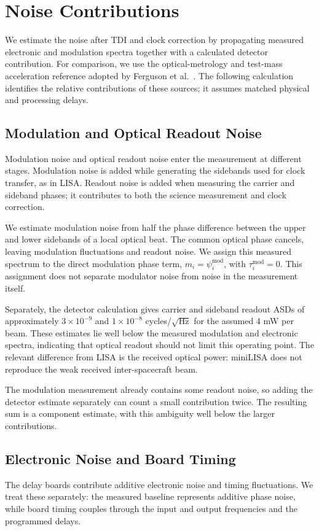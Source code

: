 \section{Noise Contributions}
\label{sec:performance}
We estimate the noise after TDI and clock correction by propagating measured electronic and modulation spectra together with a calculated detector contribution. For comparison, we use the optical-metrology and test-mass acceleration reference adopted by Ferguson et al.~\cite{ferguson2025applying}. The following calculation identifies the relative contributions of these sources; it assumes matched physical and processing delays.

\subsection{Modulation and Optical Readout Noise}
\label{sec:readout_noise}
Modulation noise and optical readout noise enter the measurement at different stages. Modulation noise is added while generating the sidebands used for clock transfer, as in LISA. Readout noise is added when measuring the carrier and sideband phases; it contributes to both the science measurement and clock correction.

We estimate modulation noise from half the phase difference between the upper and lower sidebands of a local optical beat. The common optical phase cancels, leaving modulation fluctuations and readout noise. We assign this measured spectrum to the direct modulation phase term, $m_i=\psi_i^{\mathrm{mod}}$, with $\tau_i^{\mathrm{mod}}=0$. This assignment does not separate modulator noise from noise in the measurement itself.

Separately, the detector calculation gives carrier and sideband readout ASDs of approximately $3\times10^{-9}$ and $1\times10^{-8}$ cycles/$\sqrt{\mathrm{Hz}}$ for the assumed 4 mW per beam. These estimates lie well below the measured modulation and electronic spectra, indicating that optical readout should not limit this operating point. The relevant difference from LISA is the received optical power: miniLISA does not reproduce the weak received inter-spacecraft beam.

The modulation measurement already contains some readout noise, so adding the detector estimate separately can count a small contribution twice. The resulting sum is a component estimate, with this ambiguity well below the larger contributions.

\subsection{Electronic Noise and Board Timing}
\label{sec:electronic_noise}
The delay boards contribute additive electronic noise and timing fluctuations. We treat these separately: the measured baseline represents additive phase noise, while board timing couples through the input and output frequencies and the programmed delays.

